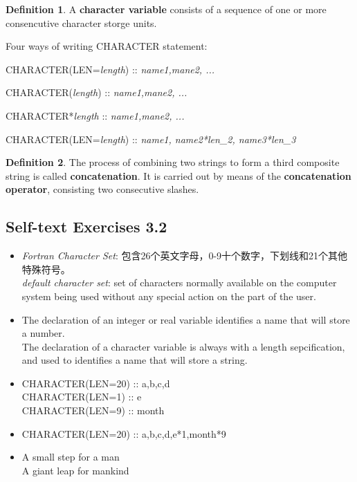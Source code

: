 \documentclass[a4paper,titlepage]{report}
\theoremstyle{definition}
\newtheorem{defn}{Definition}
\begin{document}
\begin{defn}
A \textbf{character variable} consists of a sequence of one or more consencutive character storge units.
\end{defn}

\noindent Four ways of writing CHARACTER statement: \par
\setlength{\parindent}{3ex}
CHARACTER(LEN=\textit{length}) :: \textit{name1,mane2, ...} \par
CHARACTER(\textit{length}) :: \textit{name1,mane2, ...} \par
CHARACTER*\textit{length} :: \textit{name1,mane2, ...} \par
CHARACTER(LEN=\textit{length}) :: \textit{name1, name2*len\_2, name3*len\_3}

\begin{defn}
The process of combining two strings to form a third composite string is called \textbf{concatenation}. It is carried out by means of the \textbf{concatenation operator}, consisting two consecutive slashes.
\end{defn}

\subsection*{Self-text Exercises 3.2}

\begin{itemize}
  \item[1.]
  \textit{Fortran Character Set}: 包含26个英文字母，0-9十个数字，下划线和21个其他特殊符号。 \\
  \textit{default character set}: set of characters normally available on the computer system being used without any special action on the part of the user.

  \item[2.]
  The declaration of an integer or real variable identifies a name that will store a number. \\
  The declaration of a character variable is always with a length sepcification, and used to identifies a name that will store a string.

  \item[3.]
  CHARACTER(LEN=20) :: a,b,c,d \\
  CHARACTER(LEN=1) :: e \\
  CHARACTER(LEN=9) :: month

  \item[4.]
  CHARACTER(LEN=20) :: a,b,c,d,e*1,month*9

  \item[5.]
  A small step for a man \\      
  A giant leap for mankind

\end{itemize}
\end{document}
